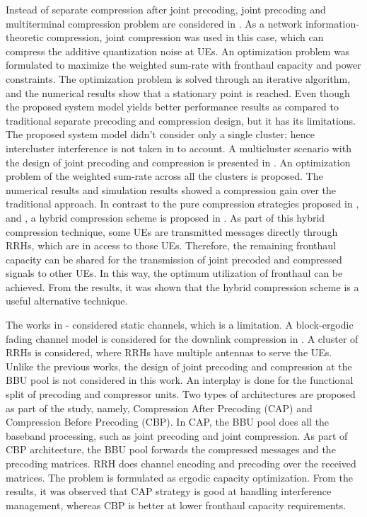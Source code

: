 \begin{multicols}{2}
\begin{itemize}
Instead of separate compression after joint precoding, joint precoding and multiterminal compression problem are considered in \cite{art3-key59}. As a network information-theoretic compression, joint compression was used in this case, which can compress the additive quantization noise at UEs. An optimization problem was formulated to maximize the weighted sum-rate with fronthaul capacity and power constraints. The optimization problem is solved through an iterative algorithm, and the numerical results show that a stationary point is reached. Even though the proposed system model yields better performance results as compared to traditional separate precoding and compression design, but it has its limitations. The proposed system model didn’t consider only a single cluster; hence intercluster interference is not taken in to account. A multicluster scenario with the design of joint precoding and compression is presented in \cite{art3-key60}. An optimization problem of the weighted sum-rate across all the clusters is proposed. The numerical results and simulation results showed a compression gain over the traditional approach. In contrast to the pure compression strategies proposed in \cite{art3-key59}, and \cite{art3-key60}, a hybrid compression scheme is proposed in \cite{art3-key61}. As part of this hybrid compression technique, some UEs are transmitted messages directly through RRHs, which are in access to those UEs. Therefore, the remaining fronthaul capacity can be shared for the transmission of joint precoded and compressed signals to other UEs. In this way, the optimum utilization of fronthaul can be achieved. From the results, it was shown that the hybrid compression scheme is a useful alternative technique. 

The works in \cite{art3-key59}-\cite{art3-key61} considered static channels, which is a limitation. A block-ergodic fading channel model is considered for the downlink compression in \cite{art3-key62}. A cluster of RRHs is considered, where RRHs have multiple antennas to serve the UEs. Unlike the previous works, the design of joint precoding and compression at the BBU pool is not considered in this work. An interplay is done for the functional split of precoding and compressor units. Two types of architectures are proposed as part of the study, namely, Compression After Precoding (CAP) and Compression Before Precoding (CBP). In CAP, the BBU pool does all the baseband processing, such as joint precoding and joint compression. As part of CBP architecture, the BBU pool forwards the compressed messages and the precoding matrices. RRH does channel encoding and precoding over the received matrices. The problem is formulated as ergodic capacity optimization. From the results, it was observed that CAP strategy is good at handling interference management, whereas CBP is better at lower fronthaul capacity requirements.


\end{itemize}
\end{multicols}
